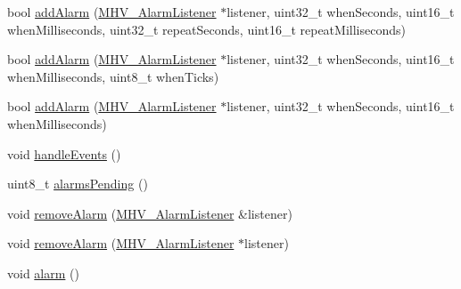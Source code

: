 \begin{DoxyCompactItemize}
\item 
bool \hyperlink{class_m_h_v___r_t_c_ab1c18cf07c95ec40a456229a89d39375}{add\-Alarm} (\hyperlink{class_m_h_v___alarm_listener}{\-M\-H\-V\-\_\-\-Alarm\-Listener} $\ast$listener, uint32\-\_\-t when\-Seconds, uint16\-\_\-t when\-Milliseconds, uint32\-\_\-t repeat\-Seconds, uint16\-\_\-t repeat\-Milliseconds)
\item 
bool \hyperlink{class_m_h_v___r_t_c_adf08714bae5d1352bebc5b1aaba333bc}{add\-Alarm} (\hyperlink{class_m_h_v___alarm_listener}{\-M\-H\-V\-\_\-\-Alarm\-Listener} $\ast$listener, uint32\-\_\-t when\-Seconds, uint16\-\_\-t when\-Milliseconds, uint8\-\_\-t when\-Ticks)
\item 
bool \hyperlink{class_m_h_v___r_t_c_a2a945db4d8a832acfdc90276a6b5b377}{add\-Alarm} (\hyperlink{class_m_h_v___alarm_listener}{\-M\-H\-V\-\_\-\-Alarm\-Listener} $\ast$listener, uint32\-\_\-t when\-Seconds, uint16\-\_\-t when\-Milliseconds)
\item 
void \hyperlink{class_m_h_v___r_t_c_abebdf394ea6ed2c48f80cc02d4371a90}{handle\-Events} ()
\item 
uint8\-\_\-t \hyperlink{class_m_h_v___r_t_c_a78c9916568b91c43ba000a8fa851e3e5}{alarms\-Pending} ()
\item 
void \hyperlink{class_m_h_v___r_t_c_a102c6e3d254e884d586ef3b9b885058b}{remove\-Alarm} (\hyperlink{class_m_h_v___alarm_listener}{\-M\-H\-V\-\_\-\-Alarm\-Listener} \&listener)
\item 
void \hyperlink{class_m_h_v___r_t_c_ad567f1efa0e4e108699d0895debc40dd}{remove\-Alarm} (\hyperlink{class_m_h_v___alarm_listener}{\-M\-H\-V\-\_\-\-Alarm\-Listener} $\ast$listener)
\item 
void \hyperlink{class_m_h_v___r_t_c_a949570f89977560cc68dc909e7d0a805}{alarm} ()
\end{DoxyCompactItemize}
